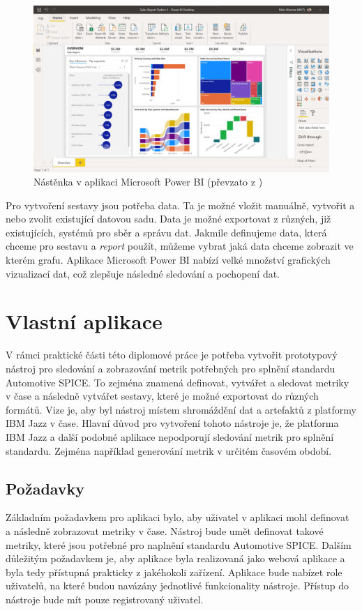 \documentclass[czech,master,public,dept460,male,cpdeclaration,oneside]{diploma}
\begin{document}
\begin{figure}[!ht]
    \centering
    \includegraphics[width=1\textwidth]{Diplomka/Figures/powerbi-dashboard.jpg}
    \caption{Nástěnka v aplikaci Microsoft Power BI (převzato z \cite{ref:microsoft_bi_general})}
    \label{fig:powerbi_dashboard}
\end{figure}

Pro vytvoření sestavy jsou potřeba data. Ta je možné vložit manuálně, vytvořit a nebo zvolit existující datovou sadu. Data je možné exportovat z různých, již existujících, systémů pro sběr a správu dat. Jakmile definujeme data, která chceme pro sestavu a \textit{report} použít, můžeme vybrat jaká data chceme zobrazit ve kterém grafu. Aplikace Microsoft Power BI nabízí velké množství grafických vizualizací dat, což zlepšuje následné sledování a pochopení dat.


\section{Vlastní aplikace}
\label{sec:my_app}
V rámci  praktické části této diplomové práce je potřeba vytvořit  prototypový nástroj pro sledování a zobrazování metrik potřebných pro splnění standardu Automotive SPICE. To zejména znamená definovat, vytvářet a sledovat metriky v čase a následně vytvářet sestavy, které je možné exportovat do různých formátů. Vize je, aby byl nástroj místem shromáždění dat a artefaktů z platformy IBM Jazz v čase. Hlavní důvod pro vytvoření tohoto nástroje je, že platforma IBM Jazz a další podobné aplikace nepodporují sledování metrik pro splnění standardu. Zejména například generování metrik v určitém časovém období.

\subsection{Požadavky}
\label{sec:requirements}
Základním požadavkem pro aplikaci bylo, aby uživatel v aplikaci mohl definovat a následně zobrazovat metriky v čase. Nástroj bude umět definovat takové metriky, které jsou potřebné pro naplnění standardu Automotive SPICE. Dalším důležitým požadavkem je, aby aplikace byla realizovaná jako webová aplikace a byla tedy přístupná prakticky z jakéhokoli zařízení. Aplikace bude nabízet role uživatelů, na které budou navázány jednotlivé funkcionality nástroje. Přístup do nástroje bude mít pouze registrovaný uživatel.
\end{document}
